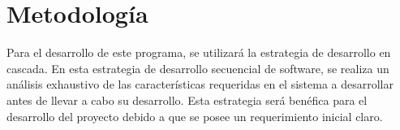 \section{Metodología}

Para el desarrollo de este programa, se utilizará la estrategia de desarrollo en cascada. En esta estrategia de desarrollo secuencial de software, se realiza un análisis exhaustivo de las características requeridas en el sistema a desarrollar antes de llevar a cabo su desarrollo. Esta estrategia será benéfica para el desarrollo del proyecto debido a que se posee un requerimiento inicial claro.\cite{Balaji2012WATEERFALLV}
